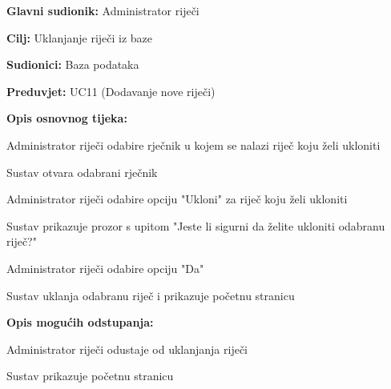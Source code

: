 					\noindent {}
				\begin{packed_item}
					
					\item \textbf{Glavni sudionik: }Administrator riječi
					\item  \textbf{Cilj:} Uklanjanje riječi iz baze
					\item  \textbf{Sudionici:} Baza podataka
					\item  \textbf{Preduvjet:} UC11 (Dodavanje nove riječi)
					\item  \textbf{Opis osnovnog tijeka:}
					
					\item[] \begin{packed_enum}
						
						\item Administrator riječi odabire rječnik u kojem se nalazi riječ koju želi ukloniti
						\item Sustav otvara odabrani rječnik
						\item Administrator riječi odabire opciju "Ukloni" za riječ koju želi ukloniti
						\item Sustav prikazuje prozor s upitom "Jeste li sigurni da želite ukloniti odabranu riječ?"
						\item Administrator riječi odabire opciju "Da"
						\item Sustav uklanja odabranu riječ i prikazuje početnu stranicu
					\end{packed_enum}
					
					\item  \textbf{Opis mogućih odstupanja:}
					
					\item[] \begin{packed_item}
						
						\item[5.a] Administrator riječi odustaje od uklanjanja riječi
						\item[] \begin{packed_enum}
						
							\item Sustav prikazuje početnu stranicu
						
						\end{packed_enum}
						
					\end{packed_item}
				\end{packed_item}
				
